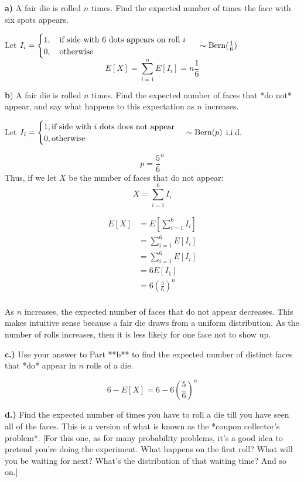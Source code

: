 \documentclass{report}
\begin{document}
\textbf{a)} A fair die is rolled $n$ times. Find the expected number of times the face with six spots appears.

Let $ I_i = \begin{cases}
	1, \quad \text{if side with 6 dots appears on roll $ i $ } \\
	0, \quad \text{otherwise}
\end{cases} \sim \operatorname{Bern}(\frac{1}{6}) $ 
$$E[X] = \sum_{i=1}^{n} E[I_i] = n\frac{1}{6}$$

\textbf{b}) A fair die is rolled $n$ times. Find the expected number of faces that *do not* appear, and say what happens to this expectation as $n$ increases.

Let $ I_i = \begin{cases}
	1, \text{if side with $ i $ dots does not appear} \\
	0, \text{otherwise}
\end{cases} \sim \operatorname{Bern}(p) $ i.i.d.

\[
p = \frac{5}{6}^{n}
\]
Thus, if we let $ X $ be the number of faces that do not appear: 
$$X =  \sum_{i=1}^{6} I_i$$

\begin{align*}
	E[X] &= E[\sum_{i=1}^{6}I_i] \\
	&= \sum_{i=1}^{6}E[I_i] \\
&=  \sum_{i=1}^{6} E[I_i] \\
&=  6E[I_1] \\ 
&= 6 \left( \frac{5}{6} \right) ^{n} \\
\end{align*}

As $n$ increases, the expected number of faces that do not appear decreases. This makes intuitive sense because a fair die draws from a uniform distribution. As the number of rolls increases, then it is less likely for one face not to show up. 

\textbf{c.)} Use your answer to Part **b** to find the expected number of distinct faces that *do* appear in $n$ rolls of a die.


\[
6-E[X] = 6- 6\left( \frac{5}{6} \right) ^{n}
\]

\textbf{d.)} Find the expected number of times you have to roll a die till you have seen all of the faces. This is a version of what is known as the *coupon collector's problem*. [For this one, as for many probability problems, it's a good idea to pretend you're doing the experiment. What happens on the first roll? What will you be waiting for next? What's the distribution of that waiting time? And so on.]
\end{document}
